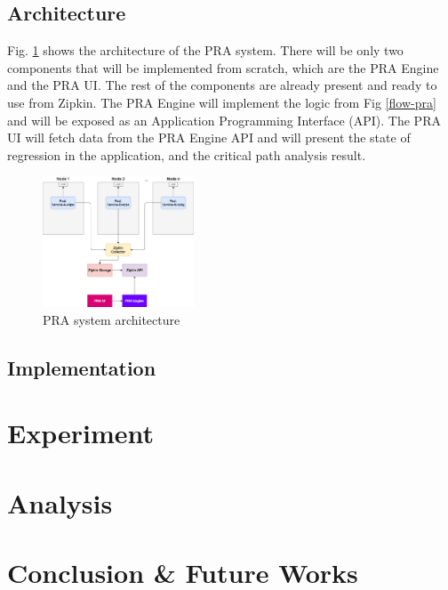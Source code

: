 \documentclass[conference]{configs/IEEEtran}
\begin{document}
\subsection{Architecture}
Fig. \ref{arch-pra} shows the architecture of the PRA system. There will be only two components that will be implemented from scratch, which are the PRA Engine and the PRA UI. The rest of the components are already present and ready to use from Zipkin. The PRA Engine will implement the logic from Fig \ref{flow-pra} and will be exposed as an Application Programming Interface (API). The PRA UI will fetch data from the PRA Engine API and will present the state of regression in the application, and the critical path analysis result.
\begin{figure}[!htb]
	\centering
	\includegraphics[width=0.4\textwidth]{resources/ch3/arch.png}
	\caption{PRA system architecture}
	\label{arch-pra}
\end{figure}



\subsection{Implementation}


\section{Experiment}

\section{Analysis}

\section{Conclusion \& Future Works}

%




\vspace{12pt}
\end{document}
